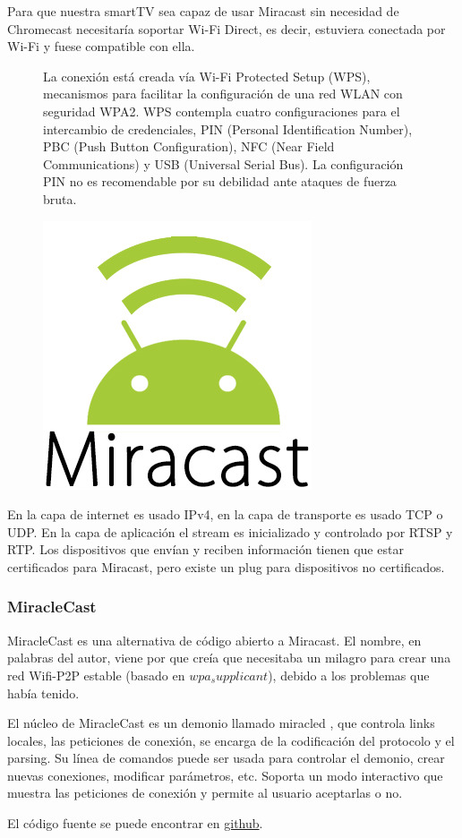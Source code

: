 Para que nuestra smartTV sea capaz de usar Miracast sin necesidad de Chromecast necesitaría soportar Wi-Fi Direct, es decir, estuviera conectada por Wi-Fi y fuese compatible con ella.

\begin{figure}[ht] 
	\begin{minipage}[b]{0.55\linewidth}
		La conexión está creada vía Wi-Fi Protected Setup (WPS), mecanismos para facilitar la configuración de una red WLAN con seguridad WPA2.
		WPS contempla cuatro configuraciones para el intercambio de credenciales, PIN (Personal Identification Number), PBC (Push Button Configuration), NFC (Near Field Communications) y USB (Universal Serial Bus). La configuración PIN no es recomendable por su debilidad ante ataques de fuerza bruta.
	\end{minipage}%
	\begin{minipage}[b]{0.45\linewidth}
		\centering
		\includegraphics[width=.55\linewidth]{./Imagenes/miracast.jpg} 
	\end{minipage} 
\end{figure}



En la capa de internet es usado IPv4, en la capa de transporte es usado TCP o UDP. En la capa de aplicación el stream es inicializado y controlado por RTSP y RTP.
Los dispositivos que envían y reciben información tienen que estar certificados para Miracast, pero existe un plug para dispositivos no certificados.



\subsubsection{MiracleCast}
MiracleCast es una alternativa de código abierto a Miracast. El nombre, en palabras del autor, viene por que creía que necesitaba un milagro para crear una red Wifi-P2P estable (basado en $wpa_supplicant$), debido a los problemas que había tenido.

El núcleo de MiracleCast es un demonio llamado miracled \cite{MiracleCast}, que controla links locales, las peticiones de conexión, se encarga de
la codificación del protocolo y el parsing.
Su línea de comandos puede ser usada para controlar el demonio, crear nuevas conexiones, modificar parámetros, etc.
Soporta un modo interactivo que muestra las peticiones de conexión y permite al usuario aceptarlas o no.

El código fuente se puede encontrar en \href{https://github.com/albfan/miraclecast}{github}.